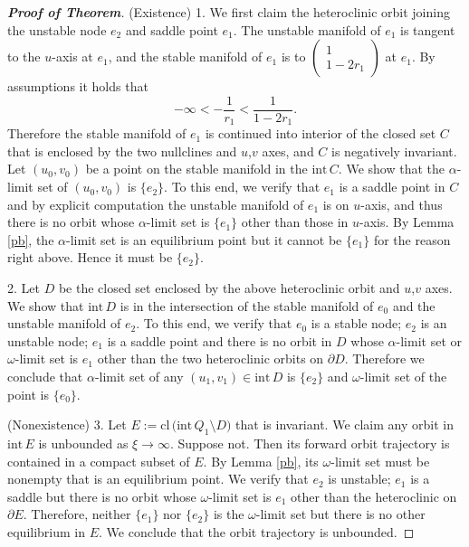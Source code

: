 \documentclass{amsart}
\theoremstyle{definition}
\numberwithin{equation}{section}
\def\ii{{\textrm{int}}\,}
\def\cl{{\textrm{cl}}\,}
\begin{document}
\begin{proof}[\textbf{Proof of Theorem}]
\bigskip
(Existence) 1. We first claim the heteroclinic orbit joining the unstable node $e_2$ and saddle point $e_1$. The unstable manifold of $e_1$ is tangent to the $u$-axis at $e_1$, and the stable manifold of $e_1$ is to $\begin{pmatrix} 1 \\ 1-2r_1 \end{pmatrix}$ at $e_1$. By assumptions it holds that
\begin{equation}\label{rel5} -\infty< -\frac{1}{r_1} < \frac{1}{1-2r_1}. \end{equation}
Therefore the stable manifold of $e_1$ is continued into interior of the closed set $C$ that is enclosed by the two nullclines and $u$,$v$ axes, and $C$ is negatively invariant. Let $(u_0,v_0)$ be a point on the stable manifold in the $\ii C$. We show that the $\alpha$-limit set of $(u_0,v_0)$ is $\{e_2\}$. To this end, we verify that $e_1$ is a saddle point in $C$ and by explicit computation the unstable manifold of $e_1$ is on $u$-axis, and thus there is no orbit whose $\alpha$-limit set is $\{e_1\}$ other than those in $u$-axis. By Lemma \ref{pb}, the $\alpha$-limit set is an equilibrium point but it cannot be $\{e_1\}$ for the reason right above. Hence it must be $\{e_2\}$.

2. Let $D$ be the closed set enclosed by the above heteroclinic orbit and $u$,$v$ axes. We show that $\ii D$ is in the intersection of the stable manifold of $e_0$ and the unstable manifold of $e_2$. To this end, we verify that $e_0$ is a stable node; $e_2$ is an unstable node; $e_1$ is a saddle point and there is no orbit in $D$ whose $\alpha$-limit set or $\omega$-limit set is $e_1$ other than the two heteroclinic orbits on $\partial D$. Therefore we conclude that $\alpha$-limit set of any $(u_1,v_1) \in\ii D$ is $\{e_2\}$ and $\omega$-limit set of the point is $\{e_0\}$.

(Nonexistence) 3. Let $E:= \cl\big(\ii Q_1 \setminus D\big)$ that is invariant. We claim any orbit in $\ii E$ is unbounded as $\xi \rightarrow \infty$. Suppose not. Then its forward orbit trajectory is contained in a compact subset of $E$. By Lemma \ref{pb}, its $\omega$-limit set must be nonempty that is an equilibrium point. We verify that $e_2$ is unstable; $e_1$ is a saddle but there is no orbit whose $\omega$-limit set is $e_1$ other than the heteroclinic on $\partial E$. Therefore, neither $\{e_1\}$ nor $\{e_2\}$ is the $\omega$-limit set but there is no other equilibrium in $E$. We conclude that the orbit trajectory is unbounded.



\end{proof}
\end{document}
